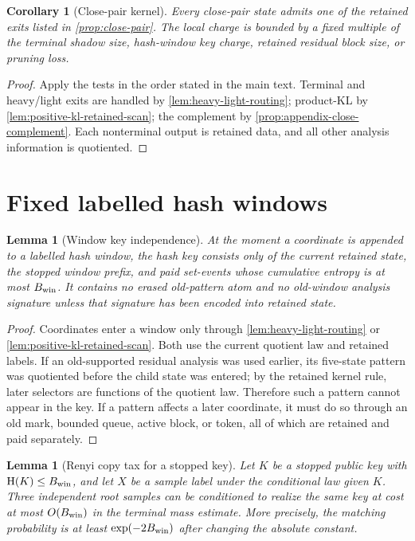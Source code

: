 \documentclass[11pt]{article}
\newcommand{\Cref}[1]{\ref{#1}}
\newtheorem{lemma}[theorem]{Lemma}
\newtheorem{corollary}[theorem]{Corollary}
\theoremstyle{remark}
\newcommand{\HH}{\mathrm H}
\begin{document}
\begin{corollary}[Close-pair kernel]\label{cor:appendix-close-kernel}
Every close-pair state admits one of the retained exits listed in \Cref{prop:close-pair}.  The local charge is bounded by a fixed multiple of the terminal shadow size, hash-window key charge, retained residual block size, or pruning loss.
\end{corollary}

\begin{proof}
Apply the tests in the order stated in the main text.  Terminal and heavy/light exits are handled by \Cref{lem:heavy-light-routing}; product-KL by \Cref{lem:positive-kl-retained-scan}; the complement by \Cref{prop:appendix-close-complement}.  Each nonterminal output is retained data, and all other analysis information is quotiented.
\end{proof}

\section{Fixed labelled hash windows}\label{app:hash}

\begin{lemma}[Window key independence]\label{lem:window-key-independence}
At the moment a coordinate is appended to a labelled hash window, the hash key consists only of the current retained state, the stopped window prefix, and paid set-events whose cumulative entropy is at most $B_{\rm win}$.  It contains no erased old-pattern atom and no old-window analysis signature unless that signature has been encoded into retained state.
\end{lemma}

\begin{proof}
Coordinates enter a window only through \Cref{lem:heavy-light-routing} or \Cref{lem:positive-kl-retained-scan}.  Both use the current quotient law and retained labels.  If an old-supported residual analysis was used earlier, its five-state pattern was quotiented before the child state was entered; by the retained kernel rule, later selectors are functions of the quotient law.  Therefore such a pattern cannot appear in the key.  If a pattern affects a later coordinate, it must do so through an old mark, bounded queue, active block, or token, all of which are retained and paid separately.
\end{proof}

\begin{lemma}[Renyi copy tax for a stopped key]\label{lem:renyi-key}
Let $K$ be a stopped public key with $\HH(K)\le B_{\rm win}$, and let $X$ be a sample label under the conditional law given $K$.  Three independent root samples can be conditioned to realize the same key at cost at most $O(B_{\rm win})$ in the terminal mass estimate.  More precisely, the matching probability is at least $\exp(-2B_{\rm win})$ after changing the absolute constant.
\end{lemma}
\end{document}
